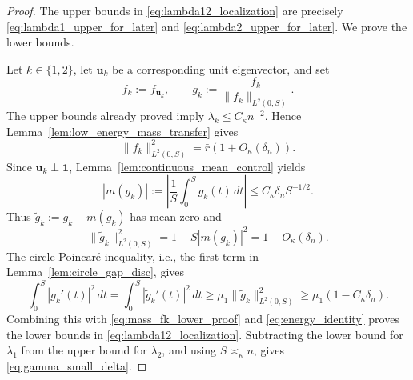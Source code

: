 \documentclass[11pt]{article}
\numberwithin{equation}{section}
\theoremstyle{definition}
\theoremstyle{remark}
\begin{document}
\begin{proof}
	The upper bounds in \eqref{eq:lambda12_localization} are precisely
	\eqref{eq:lambda1_upper_for_later} and
	\eqref{eq:lambda2_upper_for_later}. We prove the lower bounds.
	
	Let $k\in\{1,2\}$, let $\boldsymbol{u}_k$ be a corresponding unit
	eigenvector, and set
	\[
	f_k:=f_{\boldsymbol{u}_k},
	\qquad
	g_k:=\frac{f_k}{\|f_k\|_{L^2(0,S)}}.
	\]
	The upper bounds already proved imply $\lambda_k\le C_\kappa n^{-2}$.
	Hence Lemma~\ref{lem:low_energy_mass_transfer} gives
	\begin{equation}\label{eq:mass_fk_lower_proof}
		\|f_k\|_{L^2(0,S)}^2=\bar r(1+O_\kappa(\delta_n)).
	\end{equation}
	Since $\boldsymbol{u}_k\perp\boldsymbol{1}$,
	Lemma~\ref{lem:continuous_mean_control} yields
	\[
	|m(g_k)|:=\left|\frac1S\int_0^S g_k(t)\,dt\right|
	\le C_\kappa\delta_n S^{-1/2}.
	\]
	Thus $\widetilde g_k:=g_k-m(g_k)$ has mean zero and
	\[
	\|\widetilde g_k\|_{L^2(0,S)}^2=1-S|m(g_k)|^2=1+O_\kappa(\delta_n).
	\]
	The circle Poincar\'e inequality, i.e., the first term in
	Lemma~\ref{lem:circle_gap_disc}, gives
	\[
	\int_0^S|g_k'(t)|^2\,dt
	=
	\int_0^S|\widetilde g_k'(t)|^2\,dt
	\ge
	\mu_1\|\widetilde g_k\|_{L^2(0,S)}^2
	\ge
	\mu_1(1-C_\kappa\delta_n).
	\]
	Combining this with \eqref{eq:mass_fk_lower_proof} and
	\eqref{eq:energy_identity} proves the lower bounds in
	\eqref{eq:lambda12_localization}. Subtracting the lower bound for
	$\lambda_1$ from the upper bound for $\lambda_2$, and using
	$S\asymp_\kappa n$, gives \eqref{eq:gamma_small_delta}.
	

\end{proof}
\end{document}
